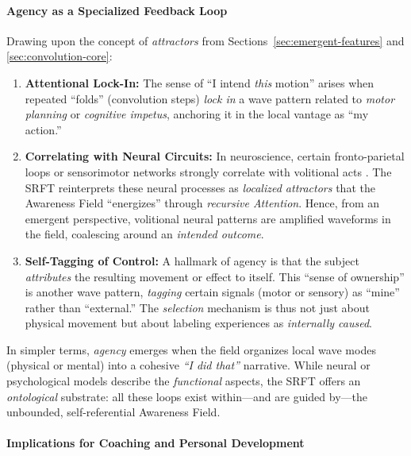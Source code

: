 \documentclass[12pt,a4paper]{article}
\begin{document}
\paragraph{Agency as a Specialized Feedback Loop}
\label{subsec:agency-feedback-loop}

Drawing upon the concept of \emph{attractors} from Sections~\ref{sec:emergent-features}
and \ref{sec:convolution-core}:
\begin{enumerate}
    \item \textbf{Attentional Lock-In:} The sense of “I intend \textit{this} motion”
    arises when repeated “folds” (convolution steps) \emph{lock in} a wave pattern
    related to \emph{motor planning} or \emph{cognitive impetus}, anchoring it in the
    local vantage as “my action.”

    \item \textbf{Correlating with Neural Circuits:} In neuroscience, certain fronto-parietal
    loops or sensorimotor networks strongly correlate with volitional acts
    \cite{frith2012action}. The SRFT reinterprets these neural processes as
    \emph{localized attractors} that the Awareness Field “energizes” through
    \emph{recursive Attention}. Hence, from an emergent perspective, volitional neural
    patterns are amplified waveforms in the field, coalescing around an
    \emph{intended outcome}.

    \item \textbf{Self-Tagging of Control:} A hallmark of agency is that the subject
    \emph{attributes} the resulting movement or effect to itself. This “sense of ownership”
    is another wave pattern, \emph{tagging} certain signals (motor or sensory) as “mine”
    rather than “external.” The \emph{selection} mechanism is thus not just about
    physical movement but about labeling experiences as \emph{internally caused}.
\end{enumerate}

\noindent
In simpler terms, \emph{agency} emerges when the field organizes local wave modes
(physical or mental) into a cohesive \emph{“I did that”} narrative. While neural or
psychological models describe the \emph{functional} aspects, the SRFT offers an
\emph{ontological} substrate: all these loops exist within—and are guided by—the
unbounded, self-referential Awareness Field.

\paragraph{Implications for Coaching and Personal Development}
\label{subsec:agency-coaching}
\end{document}
